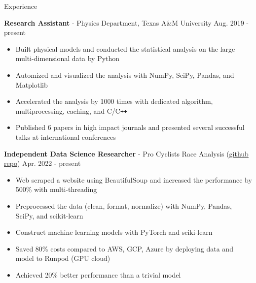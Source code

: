 \documentclass{resume}
\begin{document}
\vspace{-0.5em}
\begin{rSection}{Experience}
    \vspace{-1em}
    \item \textbf{Research Assistant} - Physics Department, Texas A\&M University \hfill Aug. 2019 - present
        \begin{itemize}
        \item Built physical models and conducted the statistical analysis on the large multi-dimensional data by Python
        \item Automized and visualized the analysis with NumPy, SciPy, Pandas, and Matplotlib
        \item Accelerated the analysis by 1000 times with dedicated algorithm, multiprocessing, caching, and C/C\texttt{++}
        \item Published 6 papers in high impact journals and presented several successful talks at international conferences
        \end{itemize}

    \item \textbf{Independent Data Science Researcher} - {Pro Cyclists Race Analysis} (\href{https://github.com/noctildon/pro_cyclists}{github repo}) \hfill Apr. 2022 - present
        \begin{itemize}
        \item Web scraped a website using BeautifulSoup and increased the performance by 500\% with multi-threading
        \item Preprocessed the data (clean, format, normalize) with NumPy, Pandas, SciPy, and scikit-learn
        \item Construct machine learning models with PyTorch and sciki-learn
        \item Saved 80\% costs compared to AWS, GCP, Azure by deploying data and model to Runpod (GPU cloud)
        \item Achieved 20\% better performance than a trivial model
        \end{itemize}


\end{rSection}
\end{document}
